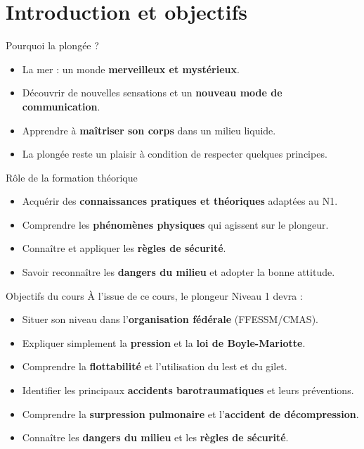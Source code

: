 \section{Introduction et objectifs}

\begin{frame}{Pourquoi la plongée ?}
  \begin{itemize}
    \item La mer : un monde \textbf{merveilleux et mystérieux}.
    \item Découvrir de nouvelles sensations et un \textbf{nouveau mode de communication}.
    \item Apprendre à \textbf{maîtriser son corps} dans un milieu liquide.
    \item La plongée reste un \alert{plaisir} à condition de respecter quelques principes.
  \end{itemize}
\end{frame}

\begin{frame}{Rôle de la formation théorique}
  \begin{itemize}
    \item Acquérir des \textbf{connaissances pratiques et théoriques} adaptées au N1.
    \item Comprendre les \textbf{phénomènes physiques} qui agissent sur le plongeur.
    \item Connaître et appliquer les \textbf{règles de sécurité}.
    \item Savoir reconnaître les \textbf{dangers du milieu} et adopter la bonne attitude.
  \end{itemize}
\end{frame}

\begin{frame}{Objectifs du cours}
  À l’issue de ce cours, le plongeur Niveau 1 devra :
  \begin{itemize}
    \item Situer son niveau dans l’\textbf{organisation fédérale} (FFESSM/CMAS).
    \item Expliquer simplement la \textbf{pression} et la \textbf{loi de Boyle-Mariotte}.
    \item Comprendre la \textbf{flottabilité} et l’utilisation du lest et du gilet.
    \item Identifier les principaux \textbf{accidents barotraumatiques} et leurs préventions.
    \item Comprendre la \textbf{surpression pulmonaire} et l’\textbf{accident de décompression}.
    \item Connaître les \textbf{dangers du milieu} et les \textbf{règles de sécurité}.
  \end{itemize}
\end{frame}

